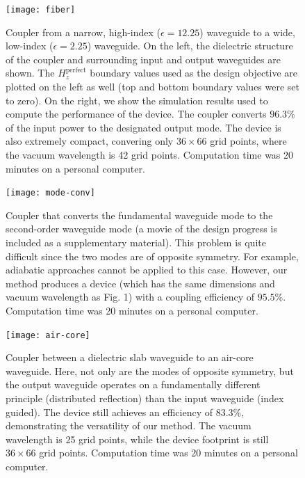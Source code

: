 \documentclass[letterpaper,10pt]{article}
\begin{document}
\begin{figure}[htbp]
    \centering
    \texttt{[image: fiber]} 
    \caption{Coupler from a narrow, high-index ($\epsilon=12.25$) waveguide to
        a wide, low-index ($\epsilon=2.25$) waveguide. 
        On the left, the dielectric structure of the coupler 
        and surrounding input and output waveguides are shown.
        The $H_z^\text{perfect}$ boundary values used as 
        the design objective are plotted on the left as well
        (top and bottom boundary values were set to zero).
        On the right, we show the simulation results used
        to compute the performance of the device.
        The coupler converts $96.3\%$ of the input power to the
        designated output mode.
        The device is also extremely compact, 
        convering only $36 \times 66$ grid points,
        where the vacuum wavelength is 42 grid points.
        Computation time was 20 minutes on a personal computer.}
    \label{fig:fiber}
\end{figure}
\begin{figure}[htbp]
    \centering
    \texttt{[image: mode-conv]} 
    \caption{Coupler that converts the fundamental waveguide mode to the
        second-order waveguide mode
        (a movie of the design progress is included as a
        supplementary material).
        This problem is quite difficult since the two modes are of 
        opposite symmetry.
        For example, adiabatic approaches cannot be applied to this case.
        However, our method produces a device 
        (which has the same dimensions and vacuum wavelength as Fig. 1) 
        with a coupling efficiency of $95.5\%$. 
        Computation time was 20 minutes on a personal computer.
        }
    \label{fig:mode}
    \end{figure}
\begin{figure}[htbp]
    \centering
    \texttt{[image: air-core]}
    \caption{Coupler between a dielectric slab waveguide to 
        an air-core waveguide.
        Here, not only are the modes of opposite symmetry,
        but the output waveguide operates on a fundamentally different
        principle (distributed reflection) than the input waveguide 
        (index guided).
        The device still achieves an efficiency of $83.3\%$, demonstrating the
        versatility of our method.
        The vacuum wavelength is 25 grid points, 
        while the device footprint is still $36 \times 66$ grid points.
        Computation time was 20 minutes on a personal computer.
        }
        \label{fig:aircore}
\end{figure}
\end{document}
